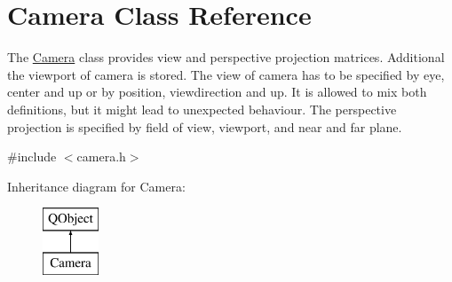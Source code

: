 \hypertarget{class_camera}{\section{Camera Class Reference}
\label{class_camera}
}


The \hyperlink{class_camera}{Camera} class provides view and perspective projection matrices. Additional the viewport of camera is stored.  The view of camera has to be specified by eye, center and up or by position, viewdirection and up. It is allowed to mix both definitions, but it might lead to unexpected behaviour. The perspective projection is specified by field of view, viewport, and near and far plane.  




{\ttfamily \#include $<$camera.\+h$>$}

Inheritance diagram for Camera\+:\begin{figure}[H]
\begin{center}
\leavevmode
\includegraphics[height=2.000000cm]{class_camera}
\end{center}
\end{figure}
